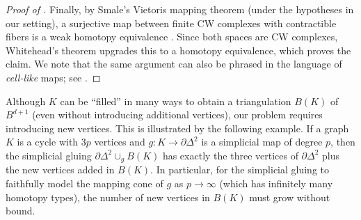 \documentclass[a4paper,english,cleveref,autoref,thm-restate,nolineno]{socg-lipics-v2021}
\begin{document}
\begin{proof}[Proof of ]
	Finally, by Smale's Vietoris mapping theorem (under the hypotheses in our setting), a surjective map between finite CW complexes with contractible fibers is a weak homotopy equivalence \cite{smale1957vietoris}.
	Since both spaces are CW complexes, Whitehead's theorem upgrades this to a homotopy equivalence, which proves the claim.
	We note that the same argument can also be phrased in the language of \emph{cell-like} maps; see \cite[Theorem~1.3]{lacher1969cell}.
\end{proof}

\begin{remark}
	Although $K$ can be ``filled'' in many ways to obtain a triangulation $B(K)$ of $B^{d+1}$ (even without introducing additional vertices), our problem requires introducing new vertices.
	This is illustrated by the following example.
	If a graph $K$ is a cycle with $3p$ vertices and $g\colon K\to \partial\Delta^2$ is a simplicial map of degree $p$, then the simplicial gluing $\partial\Delta^2\cup_g B(K)$ has exactly the three vertices of $\partial\Delta^2$ plus the new vertices added in $B(K)$.
	In particular, for the simplicial gluing to faithfully model the mapping cone of $g$ as $p\to\infty$ (which has infinitely many homotopy types), the number of new vertices in $B(K)$ must grow without bound.
\end{remark}

\raydescendstoquotient*
\end{document}
